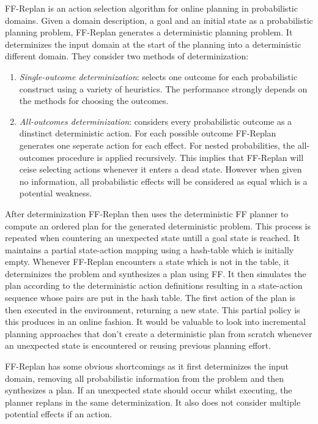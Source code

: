 \documentclass[runningheads,a4paper]{llncs}
\begin{document}
FF-Replan is an action selection algorithm for online planning in probabilistic domains. Given a domain description, a goal and an initial state as a probabilistic planning problem, FF-Replan generates a deterministic planning problem. It determinizes the input domain at the start of the planning into a deterministic different domain. They consider two methods of determinization:
\begin{enumerate}
	\item \emph{Single-outcome determinization}: selects one outcome for each probabilistic construct using a variety of heuristics. The performance strongly depends on the methods for choosing the outcomes.
	\item \emph{All-outcomes determinization}: considers every probabilistic outcome as a dinstinct deterministic action. For each possible outcome  FF-Replan generates one seperate action for each effect. For nested probabilities, the all-outcomes procedure is applied recursively. This implies that FF-Replan will ceise selecting actions whenever it enters a dead state. However when given no information, all probabilistic effects will be considered as equal which is a potential weakness.
\end{enumerate}

After determinization FF-Replan then uses the deterministic FF planner to compute an ordered plan for the generated deterministic problem. This process is repeated when countering an unexpected state untill a goal state is reached. It maintains a partial state-action mapping using a hash-table which is initially empty. Whenever FF-Replan encounters a state which is not in the table, it determinizes the problem and synthesizes a plan using FF. It then simulates the plan according to the deterministic action definitions resulting in a state-action sequence whose pairs are put in the hash table. The first action of the plan is then executed in the environment, returning a new state. This partial policy is this produces in an online fashion. It would be valuable to look into incremental planning approaches that don't create a deterministic plan from scratch whenever an unexpected state is encountered or reusing previous planning effort.

FF-Replan has some obvious shortcomings as it first determinizes the input domain, removing all probabilistic information from the problem and then synthesizes a plan. If an unexpected state should occur whilst executing, the planner replans in the same determinization. It also does not consider multiple potential effects if an action.
\end{document}
